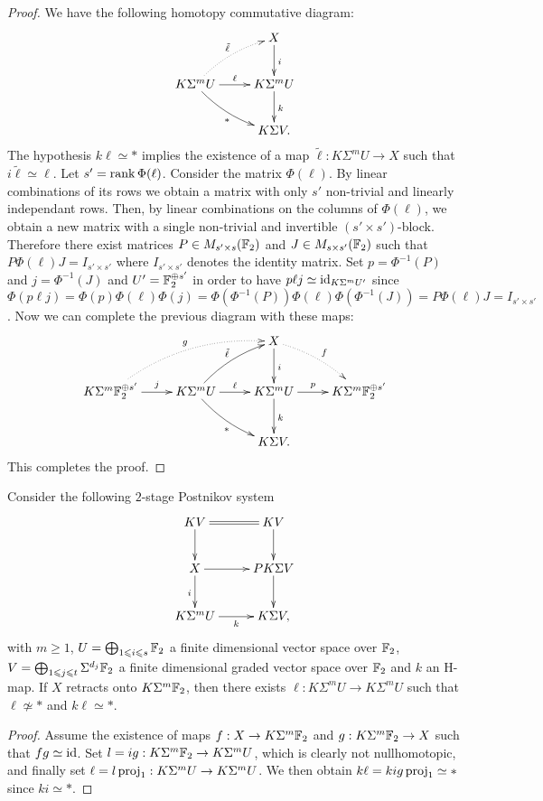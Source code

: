 \begin{proof}
We have the following homotopy commutative diagram:
$$\xymatrix{
&X\ar[d]^i\\
K\Sigma^m U\ar[r]^-{\ell}\ar@/^/@{.>}[ru]^{\tilde{\ell}}\ar@/_/[rd]_{*} &K\Sigma^m U\ar[d]^k\\
&K\Sigma V.
}$$ The hypothesis $k\ell\simeq *$ implies the existence of a map $\tilde{\ell}:K\Sigma^m U\to X$ such that $i\tilde{\ell}\simeq\ell$. Let $s'=\operatorname{rank}\Phi(\ell)$. Consider the matrix $\Phi(\ell)$. By linear combinations of its rows we obtain a matrix with only $s'$ non-trivial and linearly independant rows. Then, by linear combinations on the columns of $\Phi(\ell)$, we obtain a new matrix with a single non-trivial and invertible $(s'\times s')$-block. Therefore there exist matrices $P\in M_{s'\times s}(\mathbb{F}_2)$ and $J\in M_{s\times s'}(\mathbb{F}_2)$ such that $P\Phi(\ell)J=I_{s'\times s'}$ where $I_{s'\times s'}$ denotes the identity matrix. Set $p=\Phi^{-1}(P)$ and $j=\Phi^{-1}(J)$ and $U'=\mathbb{F}_2^{\oplus s'}$ in order to have $p\ell j\simeq\operatorname{id}_{K\Sigma^m U'}$ since $\Phi(p\ell j)=\Phi(p)\Phi(\ell)\Phi(j)=\Phi(\Phi^{-1}(P))\Phi(\ell)\Phi(\Phi^{-1}(J))=P\Phi(\ell)J=I_{s'\times s'}$. Now we can complete the previous diagram with these maps:
$$\xymatrix{
&&X\ar[d]^i\ar@/^/@{.>}[rd]^f\\
K\Sigma^m\F_2^{\oplus s'}\ar[r]^-j\ar@/^0.5truecm/@{.>}[rru]^g &K\Sigma^m U\ar[r]^-{\ell}\ar@/^/[ru]^{\tilde{\ell}}\ar@/_/[rd]_{*} &K\Sigma^m U\ar[d]^k \ar[r]^-p &K\Sigma^m\F_2^{\oplus s'}\\
&&K\Sigma V.
}$$ This completes the proof.
\end{proof}

\begin{lem}\label{l:when retracts}
Consider the following $2$-stage Postnikov system 
$$\xymatrix{
KV\ar[d]\ar@{=}[r] &KV\ar[d]\\
X\ar[r]\ar[d]_i &PK\Sigma V\ar[d]\\
K\Sigma^mU\ar[r]_-k &K\Sigma V,
}$$ with $m\geq1$, $U=\bigoplus_{1\leqslant i\leqslant s}\mathbb{F}_2$ a finite dimensional vector space over $\mathbb{F}_2$, $V=\bigoplus_{1\leqslant j\leqslant t}\Sigma^{d_j}\mathbb{F}_2$ a finite dimensional graded vector space over $\mathbb{F}_2$ and $k$ an H-map. If $X$ retracts onto $K\Sigma^m \mathbb{F}_2$, then there exists $\ell:K\Sigma^m U\to K\Sigma^m U$ such that $\ell\not\simeq *$ and $k\ell\simeq *$.
\end{lem}

\vskip5cm
\begin{proof}
Assume the existence of maps $f:X\to K\Sigma^m\mathbb{F}_2$ and $g:K\Sigma^m\mathbb{F}_2\to X$ such that $fg\simeq\operatorname{id}$. Set $l=ig:K\Sigma^m\mathbb{F}_2\to K\Sigma^m U$, which is clearly not nullhomotopic, and finally set $\ell=l\operatorname{proj}_1:K\Sigma^m U\to K\Sigma^m U$. We then obtain $k\ell=kig\operatorname{proj}_1\simeq *$ since $ki\simeq *$.
\end{proof}

